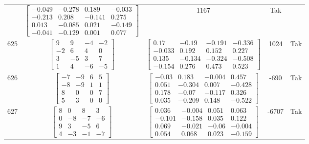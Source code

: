 \documentclass[a4paper,12pt]{article}
\begin{document}
\begin{tabular}{c c c c c}
&
$\begin{bmatrix} -0.049 & -0.278 & 0.189 & -0.033 \\ -0.213 & 0.208 & -0.141 & 0.275 \\ 0.013 & -0.085 & 0.021 & -0.149 \\ -0.041 & -0.129 & 0.001 & 0.077 \end{bmatrix}$
&
1167
&
Tak
\\
625
&
$\begin{bmatrix} 9 & 9 & -4 & -2 \\ -2 & 6 & 4 & 0 \\ 3 & -5 & 3 & 7 \\ 1 & 4 & -6 & -5 \end{bmatrix}$
&
$\begin{bmatrix} 0.17 & -0.19 & -0.191 & -0.336 \\ -0.033 & 0.192 & 0.152 & 0.227 \\ 0.135 & -0.134 & -0.324 & -0.508 \\ -0.154 & 0.276 & 0.473 & 0.523 \end{bmatrix}$
&
1024
&
Tak
\\
626
&
$\begin{bmatrix} -7 & -9 & 6 & 5 \\ -8 & -9 & 1 & 1 \\ 8 & 0 & 0 & 7 \\ 5 & 3 & 0 & 0 \end{bmatrix}$
&
$\begin{bmatrix} -0.03 & 0.183 & -0.004 & 0.457 \\ 0.051 & -0.304 & 0.007 & -0.428 \\ 0.178 & -0.07 & -0.117 & 0.326 \\ 0.035 & -0.209 & 0.148 & -0.522 \end{bmatrix}$
&
-690
&
Tak
\\
627
&
$\begin{bmatrix} 8 & 0 & 8 & 3 \\ 0 & -8 & -7 & -6 \\ 9 & 3 & -5 & 6 \\ 4 & -3 & -1 & -7 \end{bmatrix}$
&
$\begin{bmatrix} 0.036 & -0.004 & 0.051 & 0.063 \\ -0.101 & -0.158 & 0.035 & 0.122 \\ 0.069 & -0.021 & -0.06 & -0.004 \\ 0.054 & 0.068 & 0.023 & -0.159 \end{bmatrix}$
&
-6707
&
Tak
\\

\end{tabular}
\end{document}

